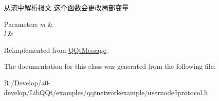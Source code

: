从流中解析报文 这个函数会更改局部变量 


\begin{DoxyParams}{Parameters}
{\em m} & \\
\hline
{\em l} & \\
\hline
\end{DoxyParams}


Reimplemented from \mbox{\hyperlink{class_q_qt_message_a0bc25669bdd61490b1d8df6d77565f31}{Q\+Qt\+Message}}.



The documentation for this class was generated from the following file\+:\begin{DoxyCompactItemize}
\item 
R\+:/\+Develop/a0-\/develop/\+Lib\+Q\+Qt/examples/qqtnetworkexample/usernode5protocol.\+h\end{DoxyCompactItemize}
